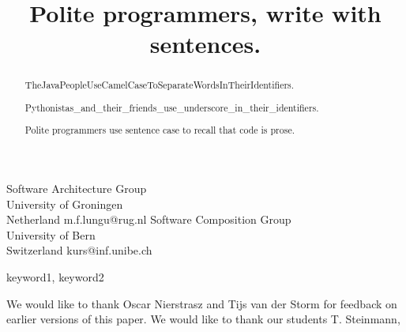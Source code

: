 \documentclass[preprint]{sigplanconf}
\begin{document}
\setlength{\pdfpageheight}{\paperheight}
\setlength{\pdfpagewidth}{\paperwidth}




\title{Polite programmers, write with sentences.}

           {Software Architecture Group\\
           University of Groningen\\
           Netherland}
           {m.f.lungu@rug.nl}
           {Software Composition Group\\
           University of Bern\\
           Switzerland}
           {kurs@inf.unibe.ch}

\maketitle

\begin{abstract}

\noindent
TheJavaPeopleUseCamelCaseToSeparateWordsInTheirIdentifiers. 

\noindent
Pythonistas\_and\_their\_friends\_use\_underscore\_in\_their\_identifiers. 

\noindent
Polite programmers use sentence case to recall that code is prose.
\end{abstract}
\vspace {1cm}

\keywords
keyword1, keyword2








\acks

We would like to thank Oscar Nierstrasz and Tijs van der Storm for feedback on earlier versions of this paper. We would like to thank our students T. Steinmann, 










\end{document}
